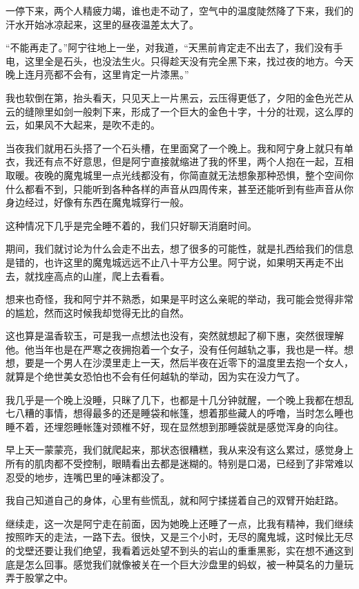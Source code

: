 一停下来，两个人精疲力竭，谁也走不动了，空气中的温度陡然降了下来，我们的汗水开始冰凉起来，这里的昼夜温差太大了。

“不能再走了。”阿宁往地上一坐，对我道，“天黑前肯定走不出去了，我们没有手电，这里全是石头，也没法生火。只得趁天没有完全黑下来，找过夜的地方。今天晚上连月亮都不会有，这里肯定一片漆黑。”

我也软倒在第，抬头看天，只见天上一片黑云，云压得更低了，夕阳的金色光芒从云的缝隙里如剑一般刺下来，形成了一个巨大的金色十字，十分的壮观，这么厚的云，如果风不大起来，是吹不走的。

当夜我们就用石头搭了一个石头槽，在里面窝了一个晚上。我和阿宁身上就只有单衣，我还有点不好意思，但是阿宁直接就缩进了我的怀里，两个人抱在一起，互相取暖。夜晚的魔鬼城里一点光线都没有，你简直就无法想象那种恐惧，整个空间你什么都看不到，只能听到各种各样的声音从四周传来，甚至还能听到有些声音从你身边经过，好像有东西在魔鬼城穿行一般。

这种情况下几乎是完全睡不着的，我们只好聊天消磨时间。

期间，我们就讨论为什么会走不出去，想了很多的可能性，就是扎西给我们的信息是错的，也许这里的魔鬼城远远不止八十平方公里。阿宁说，如果明天再走不出去，就找座高点的山崖，爬上去看看。

想来也奇怪，我和阿宁并不熟悉，如果是平时这么亲昵的举动，我可能会觉得非常的尴尬，然而这时候我却觉得无比的自然。

这也算是温香软玉，可是我一点想法也没有，突然就想起了柳下惠，突然很理解他。他当年也是在严寒之夜拥抱着一个女子，没有任何越轨之事，我也是一样。想想，要是一个男人在沙漠里走上一天，然后半夜在近零下的温度里去抱一个女人，就算是个绝世美女恐怕也不会有任何越轨的举动，因为实在没力气了。

我几乎是一个晚上没睡，只眯了几下，也都是十几分钟就醒，一个晚上我都在想乱七八糟的事情，想得最多的还是睡袋和帐篷，想着那些藏人的呼噜，当时怎么睡也睡不着，还埋怨睡帐篷对颈椎不好，现在显然想到那睡袋就是感觉浑身的向往。

早上天一蒙蒙亮，我们就爬起来，那状态很糟糕，我从来没有这么累过，感觉身上所有的肌肉都不受控制，眼睛看出去都是迷糊的。特别是口渴，已经到了非常难以忍受的地步，连嘴巴里的唾沫都没了。

我自己知道自己的身体，心里有些慌乱，就和阿宁揉搓着自己的双臂开始赶路。

继续走，这一次是阿宁走在前面，因为她晚上还睡了一点，比我有精神，我们继续按照昨天的走法，一路下去。很快，又是三个小时，无尽的魔鬼城，这时候比无尽的戈壁还要让我们绝望，我看着远处望不到头的岩山的重重黑影，实在想不通这到底是怎么回事。感觉我们就像被关在一个巨大沙盘里的蚂蚁，被一种莫名的力量玩弄于股掌之中。

